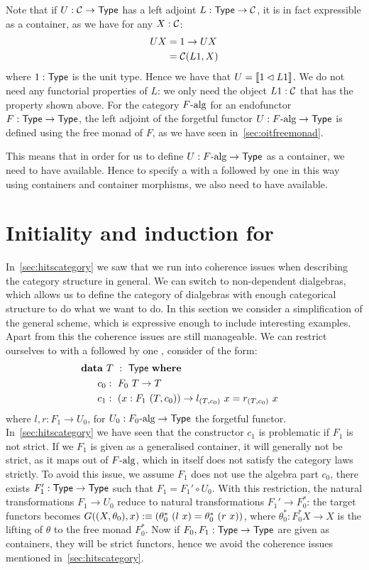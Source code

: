 \documentclass[a4paper,10pt]{report}
\begin{document}
Note that if $U : \mathcal{C} \to \mathsf{Type}$ has a left adjoint $L : \mathsf{Type} \to \mathcal{C}$,
it is in fact expressible as a container, as we have for any $X : \mathcal{C}$:
%
\begin{align*}
  U X &= 1 \to U X \\
      &= \mathcal{C}(L1, X)
\end{align*}
%
where $1 : \mathsf{Type}$ is the unit type. Hence we have that
$U = \llbracket 1 \lhd L 1 \rrbracket$. We do not need any functorial properties of $L$:
we only need the object $L1 : \mathcal{C}$ that has the property shown
above. For the category $F\mbox{-alg}$ for an endofunctor
$F : \mathsf{Type} \to \mathsf{Type}$, the left adjoint of the forgetful functor
$U : F\mbox{-alg} \to \mathsf{Type}$ is defined using the free monad of $F$, as
we have seen in~\cref{sec:oitfreemonad}.

This means that in order for us to define $U : F\mbox{-alg} \to \mathsf{Type}$
as a container, we need to have \oits available. Hence to specify \eg
a \hit with a \zeroconstructor followed by one \oneconstructor in this
way using containers and container morphisms, we also need to have
\oits available.

\chapter{Initiality and induction for \onehits}
\label{sec:onehits}

In~\cref{sec:hitscategory} we saw that we run into coherence issues
when describing the category structure in general. We can switch to
non-dependent dialgebras, which allows us to define the category of
dialgebras with enough categorical structure to do what we want to
do. In this section we consider a simplification of the general
scheme, which is expressive enough to include interesting
examples. Apart from this the coherence issues are still
manageable. We can restrict ourselves to \hits with a
\zeroconstructors followed by one \oneconstructor, \ie consider \hits
of the form:
%
\begin{alignat*}{2}
  &\rlap{$\data\ T\ :\ \Type\ \where$} \\
  &&\ \ c_0  &:\ F_0\ T \to T \\
  &&\ \ c_1  &:\ (x : F_1\ (T,c_0)) \to l_{(T,c_0)}\ x = r_{(T,c_0)}\ x
\end{alignat*}
%
where $l, r : F_1 \to U_0$, for $U_0 : F_0\mbox{-alg} \to \mathsf{Type}$ the
forgetful functor. In~\cref{sec:hitscategory} we have seen that the
constructor $c_1$ is problematic if $F_1$ is not strict. If we $F_1$
is given as a generalised container, it will generally not be strict,
as it maps out of $F\mbox{-alg}$, which in itself does not satisfy the
category laws strictly. To avoid this issue, we assume $F_1$ does not
use the algebra part $c_0$, \ie there exists $F_1' : \mathsf{Type} \to \mathsf{Type}$
such that $F_1 = F_1' \circ U_0$. With this restriction, the natural
transformations $F_1 \to U_0$ reduce to natural transformations
$F_1' \to F_0^*$: the target functors becomes
$G ((X,\theta_0), x) :\equiv (\theta_0^*\ (l\ x) = \theta_0^*\ (r\
x))$,
where $\theta_0^* : F_0^* X \to X$ is the lifting of $\theta$ to the
free monad $F_0^*$. Now if $F_0, F_1 : \mathsf{Type} \to \mathsf{Type}$ are given as
containers, they will be strict functors, hence we avoid the coherence
issues mentioned in~\cref{sec:hitscategory}.
\end{document}
